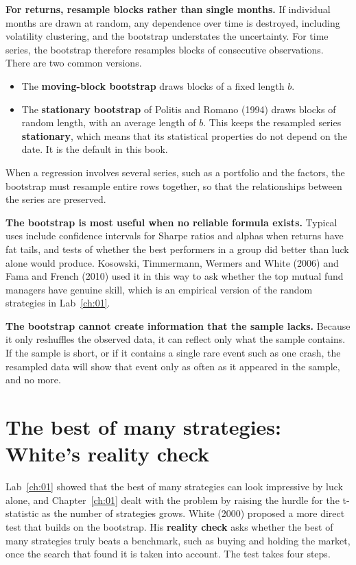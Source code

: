 \textbf{For returns, resample blocks rather than single months.} If individual months are drawn at random, any dependence over time is destroyed, including volatility clustering, and the bootstrap understates the uncertainty. For time series, the bootstrap therefore resamples blocks of consecutive observations. There are two common versions.

\begin{itemize}
  \item The \textbf{moving-block bootstrap} draws blocks of a fixed length $b$.
  \item The \textbf{stationary bootstrap} of Politis and Romano (1994) draws blocks of random length, with an average length of $b$. This keeps the resampled series \textbf{stationary}, which means that its statistical properties do not depend on the date. It is the default in this book.
\end{itemize}

When a regression involves several series, such as a portfolio and the factors, the bootstrap must resample entire rows together, so that the relationships between the series are preserved.

\textbf{The bootstrap is most useful when no reliable formula exists.} Typical uses include confidence intervals for Sharpe ratios and alphas when returns have fat tails, and tests of whether the best performers in a group did better than luck alone would produce. Kosowski, Timmermann, Wermers and White (2006) and Fama and French (2010) used it in this way to ask whether the top mutual fund managers have genuine skill, which is an empirical version of the random strategies in Lab~\ref{ch:01}.

\textbf{The bootstrap cannot create information that the sample lacks.} Because it only reshuffles the observed data, it can reflect only what the sample contains. If the sample is short, or if it contains a single rare event such as one crash, the resampled data will show that event only as often as it appeared in the sample, and no more.

\section{The best of many strategies: White's reality check}
\label{sec:03-reality}

Lab~\ref{ch:01} showed that the best of many strategies can look impressive by luck alone, and Chapter~\ref{ch:01} dealt with the problem by raising the hurdle for the t-statistic as the number of strategies grows. White (2000) proposed a more direct test that builds on the bootstrap. His \textbf{reality check} asks whether the best of many strategies truly beats a benchmark, such as buying and holding the market, once the search that found it is taken into account. The test takes four steps.

